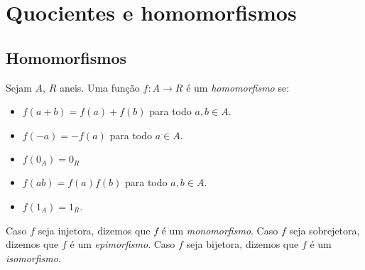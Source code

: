 \chapter{Quocientes e homomorfismos}
\section{Homomorfismos}
\begin{definition}
Sejam $A$, $R$ aneis. Uma função $f:A\rightarrow R$ é um \emph{homomorfismo} se:
\begin{itemize}
    \item $f(a+b)=f(a)+f(b)$ para todo $a, b \in A$.
    \item $f(-a)=-f(a)$ para todo $a \in A$.
    \item $f(0_A)=0_R$
    \item $f(ab)=f(a)f(b)$ para todo $a, b \in A$.
    \item $f(1_A)=1_R$.
\end{itemize}

Caso $f$ seja injetora, dizemos que $f$ é um \emph{monomorfismo}. Caso $f$ seja sobrejetora, dizemos que $f$ é um \emph{epimorfismo}. Caso $f$ seja bijetora, dizemos que $f$ é um \emph{isomorfismo}.
\end{definition}

